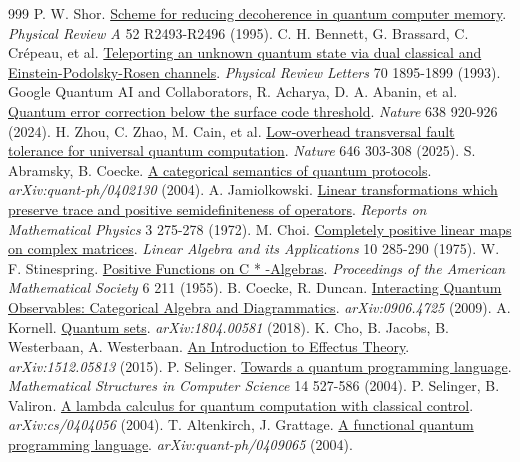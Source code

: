 \begin{thebibliography}{999}
 P. W. Shor. \href{https://doi.org/10.1103/PhysRevA.52.R2493}{Scheme for reducing decoherence in quantum computer memory}. \emph{Physical Review A} 52 R2493-R2496 (1995).
 C. H. Bennett, G. Brassard, C. Crépeau, et al. \href{https://doi.org/10.1103/PhysRevLett.70.1895}{Teleporting an unknown quantum state via dual classical and Einstein-Podolsky-Rosen channels}. \emph{Physical Review Letters} 70 1895-1899 (1993).
 Google Quantum AI and Collaborators, R. Acharya, D. A. Abanin, et al. \href{https://doi.org/10.1038/s41586-024-08449-y}{Quantum error correction below the surface code threshold}. \emph{Nature} 638 920-926 (2024).
 H. Zhou, C. Zhao, M. Cain, et al. \href{https://doi.org/10.1038/s41586-025-09543-5}{Low-overhead transversal fault tolerance for universal quantum computation}. \emph{Nature} 646 303-308 (2025).
 S. Abramsky, B. Coecke. \href{https://arxiv.org/abs/quant-ph/0402130}{A categorical semantics of quantum protocols}. \emph{arXiv:quant-ph/0402130}  (2004).
 A. Jamiolkowski. \href{https://doi.org/10.1016/0034-4877(72)90011-0}{Linear transformations which preserve trace and positive semidefiniteness of operators}. \emph{Reports on Mathematical Physics} 3 275-278 (1972).
 M. Choi. \href{https://doi.org/10.1016/0024-3795(75)90075-0}{Completely positive linear maps on complex matrices}. \emph{Linear Algebra and its Applications} 10 285-290 (1975).
 W. F. Stinespring. \href{https://doi.org/10.2307/2032342}{Positive Functions on C * -Algebras}. \emph{Proceedings of the American Mathematical Society} 6 211 (1955).
 B. Coecke, R. Duncan. \href{https://arxiv.org/abs/0906.4725}{Interacting Quantum Observables: Categorical Algebra and Diagrammatics}. \emph{arXiv:0906.4725}  (2009).
 A. Kornell. \href{https://arxiv.org/abs/1804.00581}{Quantum sets}. \emph{arXiv:1804.00581}  (2018).
 K. Cho, B. Jacobs, B. Westerbaan, A. Westerbaan. \href{https://arxiv.org/abs/1512.05813}{An Introduction to Effectus Theory}. \emph{arXiv:1512.05813}  (2015).
 P. Selinger. \href{https://doi.org/10.1017/S0960129504004256}{Towards a quantum programming language}. \emph{Mathematical Structures in Computer Science} 14 527-586 (2004).
 P. Selinger, B. Valiron. \href{https://arxiv.org/abs/cs/0404056}{A lambda calculus for quantum computation with classical control}. \emph{arXiv:cs/0404056}  (2004).
 T. Altenkirch, J. Grattage. \href{https://arxiv.org/abs/quant-ph/0409065}{A functional quantum programming language}. \emph{arXiv:quant-ph/0409065}  (2004).

\end{thebibliography}
